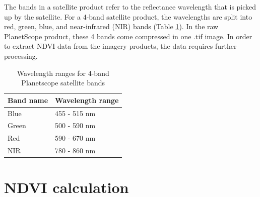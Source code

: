 \documentclass[12pt,twoside]{reedthesis}
\begin{document}
The bands in a satellite product refer to the reflectance wavelength
that is picked up by the satellite. For a 4-band satellite product, the
wavelengths are split into red, green, blue, and near-infrared (NIR)
bands (Table \ref{tab:wavelength}). In the raw PlanetScope product,
these 4 bands come compressed in one .tif image. In order to extract
NDVI data from the imagery products, the data requires further
processing.
\begin{longtable}[t]{ll}
\caption[4-band satellite wavelength ranges]{\label{tab:wavelength}Wavelength ranges for 4-band Planetscope satellite bands}\\
\toprule
Band name & Wavelength range\\
\midrule
Blue & 455 - 515 nm\\
Green & 500 - 590 nm\\
Red & 590 - 670 nm\\
NIR & 780 - 860 nm\\
\bottomrule
\end{longtable}
\hypertarget{ndvi-calculation}{%
\section{NDVI calculation}\label{ndvi-calculation}}
\end{document}
